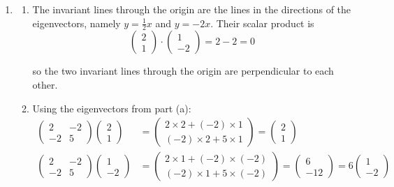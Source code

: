 \documentclass[leqno]{article}
\begin{document}
\begin{enumerate}[
  label=\textbf{\arabic*.},
  leftmargin=*,
  topsep=0pt,
  partopsep=0pt,
  parsep=0pt
]
\begin{djsSolution}
\begin{enumerate}[label=\textbf{(\alph*)}, start=1]
  \item
  \begin{enumerate}[label=(\roman*), start=1]
    \item The invariant lines through the origin are the lines in the directions of the eigenvectors, namely \(y=\frac{1}{2}x\) and \(y=-2x\). Their scalar product is
\[
\begin{pmatrix}2\\1\end{pmatrix}\cdot\begin{pmatrix}1\\-2\end{pmatrix}=2-2=0
\]

so the two invariant lines through the origin are perpendicular to each other.

    \item Using the eigenvectors from part (a):
\begin{align*}
\begin{pmatrix} 2 & -2 \\ -2 & 5 \end{pmatrix}\begin{pmatrix}2\\1\end{pmatrix}&=\begin{pmatrix}2\times2+(-2)\times1\\(-2)\times2+5\times1\end{pmatrix}=\begin{pmatrix}2\\1\end{pmatrix}\\
\begin{pmatrix} 2 & -2 \\ -2 & 5 \end{pmatrix}\begin{pmatrix}1\\-2\end{pmatrix}&=\begin{pmatrix}2\times1+(-2)\times(-2)\\(-2)\times1+5\times(-2)\end{pmatrix}=\begin{pmatrix}6\\-12\end{pmatrix}=6\begin{pmatrix}1\\-2\end{pmatrix}
\end{align*}


\end{enumerate}
\end{enumerate}
\end{djsSolution}
\end{enumerate}
\end{document}
